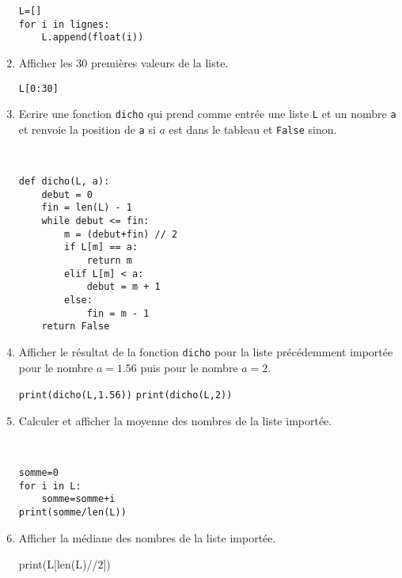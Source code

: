 \begin{enumerate}
\begin{solution}
\begin{verbatim}
L=[]
for i in lignes:
    L.append(float(i)) 
\end{verbatim}
\end{solution}
\item Afficher les 30 premières valeurs de la liste.
\begin{solution}
\verb?L[0:30]?
\end{solution}
\item Ecrire une fonction \verb?dicho? qui prend comme entrée une liste \verb?L? et un nombre \verb?a? et renvoie la position de \verb?a? si $a$ est dans le tableau et \verb?False? sinon.
\begin{solution}~ \\\vspace{-0.7cm}
\begin{verbatim}
def dicho(L, a):
    debut = 0
    fin = len(L) - 1
    while debut <= fin:
        m = (debut+fin) // 2
        if L[m] == a:
            return m
        elif L[m] < a:
            debut = m + 1
        else:
            fin = m - 1
    return False
\end{verbatim}
\end{solution}
\item Afficher le résultat de la fonction \verb?dicho? pour la liste précédemment importée pour le nombre $a=1.56$ puis pour le nombre $a=2$.
\begin{solution}
\verb?print(dicho(L,1.56))? \verb?print(dicho(L,2)) ?
\end{solution}
\item Calculer et afficher la moyenne des nombres de la liste importée.
\begin{solution}
~ \\\vspace{-0.7cm}
\begin{verbatim}
somme=0
for i in L:
	somme=somme+i
print(somme/len(L))	
\end{verbatim}
\end{solution}
\item Afficher la médiane des nombres de la liste importée.
\begin{solution}
print(L[len(L)//2])
\end{solution}
\end{enumerate}


